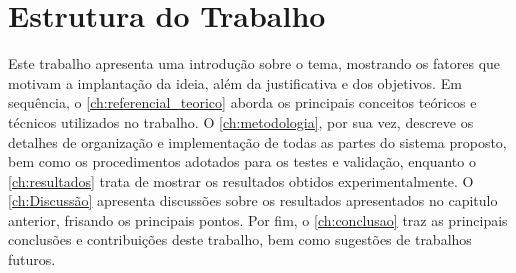 

\section{Estrutura do Trabalho}
\label{sec:estrutura_do_trabalho}
Este trabalho apresenta uma introdução sobre o tema, mostrando os fatores que motivam a implantação da ideia, além da justificativa e dos objetivos. Em sequência, o \autoref{ch:referencial_teorico} aborda os principais conceitos teóricos e técnicos utilizados no trabalho. O \autoref{ch:metodologia}, por sua vez, descreve os detalhes de organização e implementação de todas as partes do sistema proposto, bem como os procedimentos adotados para os testes e validação, enquanto o \autoref{ch:resultados} trata de mostrar os resultados obtidos experimentalmente. O \autoref{ch:Discussão} apresenta discussões sobre os resultados apresentados no capitulo anterior, frisando os principais pontos. Por fim, o \autoref{ch:conclusao} traz as principais conclusões e contribuições deste trabalho, bem como sugestões de trabalhos futuros.

